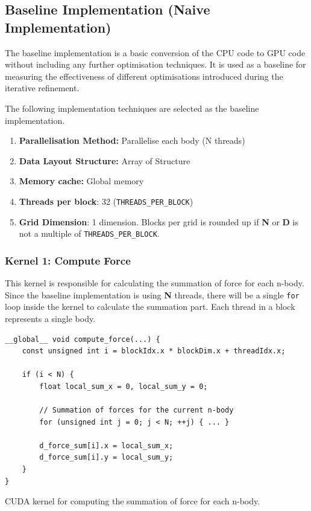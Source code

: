 \documentclass[12pt, a4paper]{article}
\begin{document}
\subsection{Baseline Implementation (Naive Implementation)}
The baseline implementation is a basic conversion of the CPU code to GPU code without including any
further optimisation techniques. It is used as a baseline for measuring the effectiveness of
different optimisations introduced during the iterative refinement.

The following implementation techniques are selected as the baseline implementation.
\begin{enumerate}
  \item \textbf{Parallelisation Method:} Parallelise each body (N threads)
  \item \textbf{Data Layout Structure:} Array of Structure
  \item \textbf{Memory cache:} Global memory
  \item \textbf{Threads per block}: 32 (\texttt{THREADS\_PER\_BLOCK})
  \item \textbf{Grid Dimension}: 1 dimension. Blocks per grid is rounded up if \textbf{N} or
  \textbf{D} is not a multiple of \texttt{THREADS\_PER\_BLOCK}.
\end{enumerate}

\subsubsection{Kernel 1: Compute Force}
This kernel is responsible for calculating the summation of force for each n-body. Since the
baseline implementation is using \textbf{N} threads, there will be a single \texttt{for} loop
inside the kernel to calculate the summation part. Each thread in a block represents a single body.

\begin{listing}[ht]
  \begin{verbatim}
__global__ void compute_force(...) {
    const unsigned int i = blockIdx.x * blockDim.x + threadIdx.x;

    if (i < N) {
        float local_sum_x = 0, local_sum_y = 0;

        // Summation of forces for the current n-body
        for (unsigned int j = 0; j < N; ++j) { ... }

        d_force_sum[i].x = local_sum_x;
        d_force_sum[i].y = local_sum_y;
    }
}
  \end{verbatim}
  \caption{CUDA kernel for computing the summation of force for each n-body.}
\end{listing}
\end{document}
